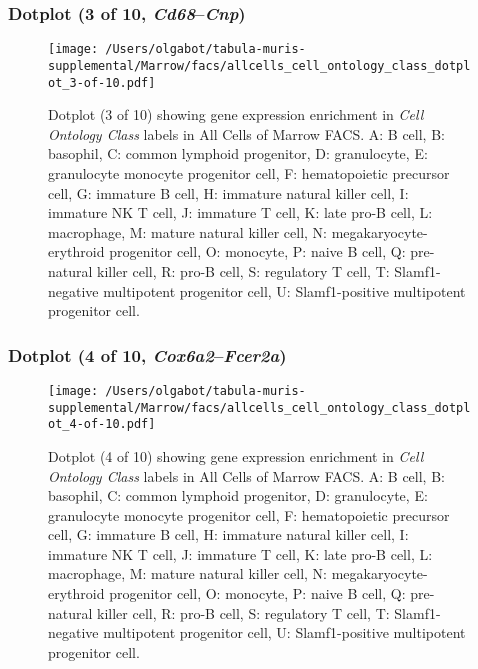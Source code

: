 \subsubsection{Dotplot (3 of 10, \emph{Cd68}--\emph{Cnp})}
\begin{figure}[h]
\centering
\texttt{[image: /Users/olgabot/tabula-muris-supplemental/Marrow/facs/allcells\_cell\_ontology\_class\_dotplot\_3-of-10.pdf]}

\caption{ Dotplot (3 of 10)  showing gene expression enrichment in \emph{Cell Ontology Class} labels in All Cells of Marrow FACS. A: B cell, B: basophil, C: common lymphoid progenitor, D: granulocyte, E: granulocyte monocyte progenitor cell, F: hematopoietic precursor cell, G: immature B cell, H: immature natural killer cell, I: immature NK T cell, J: immature T cell, K: late pro-B cell, L: macrophage, M: mature natural killer cell, N: megakaryocyte-erythroid progenitor cell, O: monocyte, P: naive B cell, Q: pre-natural killer cell, R: pro-B cell, S: regulatory T cell, T: Slamf1-negative multipotent progenitor cell, U: Slamf1-positive multipotent progenitor cell.}
\end{figure}


\clearpage

\subsubsection{Dotplot (4 of 10, \emph{Cox6a2}--\emph{Fcer2a})}
\begin{figure}[h]
\centering
\texttt{[image: /Users/olgabot/tabula-muris-supplemental/Marrow/facs/allcells\_cell\_ontology\_class\_dotplot\_4-of-10.pdf]}

\caption{ Dotplot (4 of 10)  showing gene expression enrichment in \emph{Cell Ontology Class} labels in All Cells of Marrow FACS. A: B cell, B: basophil, C: common lymphoid progenitor, D: granulocyte, E: granulocyte monocyte progenitor cell, F: hematopoietic precursor cell, G: immature B cell, H: immature natural killer cell, I: immature NK T cell, J: immature T cell, K: late pro-B cell, L: macrophage, M: mature natural killer cell, N: megakaryocyte-erythroid progenitor cell, O: monocyte, P: naive B cell, Q: pre-natural killer cell, R: pro-B cell, S: regulatory T cell, T: Slamf1-negative multipotent progenitor cell, U: Slamf1-positive multipotent progenitor cell.}
\end{figure}


\clearpage

